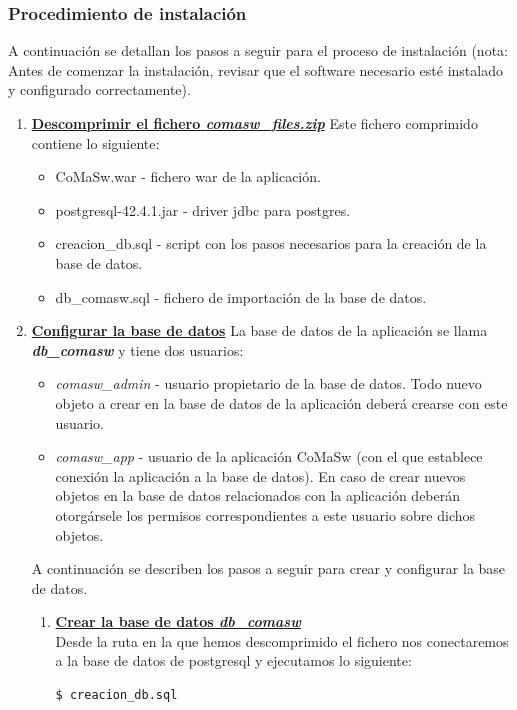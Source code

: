 \subsubsection{Procedimiento de instalación}
\label{sub:proceso-instalacion}
A continuación se detallan los pasos a seguir para el proceso de instalación (nota: Antes de comenzar la instalación, revisar que el software necesario esté instalado y configurado correctamente).
\begin{enumerate}
\item \underline{\textbf{Descomprimir el fichero \emph{comasw\_files.zip}}} \newline
Este fichero comprimido contiene lo siguiente:
	\begin{itemize}
		\item CoMaSw.war - fichero war de la aplicación.
		\item postgresql-42.4.1.jar - driver jdbc para postgres.
		\item creacion\_db.sql - script con los pasos necesarios para la creación de la base de datos.
		\item db\_comasw.sql - fichero de importación de la base de datos.
	\end{itemize}

\item \underline{\textbf{Configurar la base de datos}}\newline
La base de datos de la aplicación se llama \emph{\textbf{db\_comasw}} y tiene dos usuarios:
	\begin{itemize}
		\item \emph{comasw\_admin} - usuario propietario de la base de datos. Todo nuevo objeto a crear en la base de datos de la aplicación deberá crearse con este usuario.
		\item \emph{comasw\_app} - usuario de la aplicación CoMaSw (con el que establece conexión la aplicación a la base de datos). En caso de crear nuevos objetos en la base de datos relacionados con la aplicación deberán otorgársele los permisos correspondientes a este usuario sobre dichos objetos.
	\end{itemize}

A continuación se describen los pasos a seguir para crear y configurar la base de datos.	
	\begin{enumerate}
		\item \underline{\textbf{Crear la base de datos \emph{\textbf{db\_comasw}}}}\\
Desde la ruta en la que hemos descomprimido el fichero nos conectaremos a la base de datos de postgresql y ejecutamos lo siguiente:
\begin{lstlisting}[style=comando]
  $ creacion_db.sql
\end{lstlisting}


\end{enumerate}
\end{enumerate}
